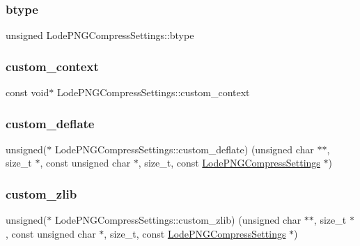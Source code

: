 \subsubsection{\texorpdfstring{btype}{btype}}
{\footnotesize\ttfamily unsigned Lode\+P\+N\+G\+Compress\+Settings\+::btype}

\mbox{\label{struct_lode_p_n_g_compress_settings_a62826645ef28e2a84dd2b65f547a2883}} 
\subsubsection{\texorpdfstring{custom\_context}{custom\_context}}
{\footnotesize\ttfamily const void$\ast$ Lode\+P\+N\+G\+Compress\+Settings\+::custom\+\_\+context}

\mbox{\label{struct_lode_p_n_g_compress_settings_a55dafebbbe017806fb2bbc32bb40a59b}} 
\subsubsection{\texorpdfstring{custom\_deflate}{custom\_deflate}}
{\footnotesize\ttfamily unsigned($\ast$ Lode\+P\+N\+G\+Compress\+Settings\+::custom\+\_\+deflate) (unsigned char $\ast$$\ast$, size\+\_\+t $\ast$, const unsigned char $\ast$, size\+\_\+t, const \mbox{\hyperlink{struct_lode_p_n_g_compress_settings}{Lode\+P\+N\+G\+Compress\+Settings}} $\ast$)}

\mbox{\label{struct_lode_p_n_g_compress_settings_a4a7835f394349f15f1302d11bcb0efa0}} 
\subsubsection{\texorpdfstring{custom\_zlib}{custom\_zlib}}
{\footnotesize\ttfamily unsigned($\ast$ Lode\+P\+N\+G\+Compress\+Settings\+::custom\+\_\+zlib) (unsigned char $\ast$$\ast$, size\+\_\+t $\ast$, const unsigned char $\ast$, size\+\_\+t, const \mbox{\hyperlink{struct_lode_p_n_g_compress_settings}{Lode\+P\+N\+G\+Compress\+Settings}} $\ast$)}

